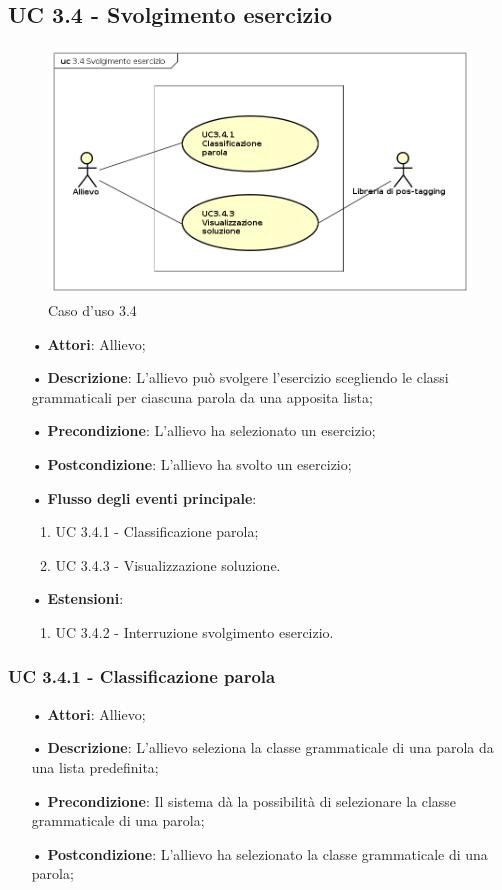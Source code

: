 \subsection{UC 3.4 - Svolgimento esercizio}
\begin{figure}[H]
\centering
\includegraphics[width=17cm]{img/UC34.png} 
\caption{Caso d'uso 3.4}\label{fig:34}
\end{figure}
\begin{itemize}
\item[•]\textbf{Attori}: Allievo;
\item[•]\textbf{Descrizione}: L’allievo può svolgere l’esercizio scegliendo le classi grammaticali per ciascuna parola da una apposita lista;
\item[•]\textbf{Precondizione}: L’allievo ha selezionato un esercizio;
\item[•]\textbf{Postcondizione}: L’allievo ha svolto un esercizio;
\item[•]\textbf{Flusso degli eventi principale}:
\begin{enumerate}
\item UC 3.4.1 - Classificazione parola;
\item UC 3.4.3 - Visualizzazione soluzione.
\end{enumerate}
\item[•]\textbf{Estensioni}:
\begin{enumerate}
\item UC 3.4.2 - Interruzione svolgimento esercizio.
\end{enumerate}
\end{itemize}

\subsubsection{UC 3.4.1 - Classificazione parola}
\begin{itemize}
\item[•]\textbf{Attori}: Allievo;
\item[•]\textbf{Descrizione}: L’allievo seleziona la classe grammaticale di una parola da una lista predefinita;
\item[•]\textbf{Precondizione}: Il sistema dà la possibilità di selezionare la classe grammaticale di una parola;
\item[•]\textbf{Postcondizione}: L’allievo ha selezionato la classe grammaticale di una parola;
\end{itemize}


